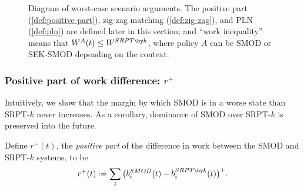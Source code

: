 \documentclass[acmsmall]{acmart}
\begin{document}
\begin{figure}
\caption{Diagram of worst-case scenario arguments. The positive part (\cref{def:positive-part}), zig-zag matching (\cref{def:zig-zag}), and PLN (\cref{def:pln}) are defined later in this section; and ``work inequality'' means that $W^A(t)\leq W^{SRPT\hy k}$, where policy $A$ can be SMOD or SEK-SMOD depending on the context.} \label{diagram:worst-case}
\end{figure}



\subsubsection{Positive part of work difference: $r^+$}
\label{sec:positive-part}

 Intuitively, we show that the margin by which SMOD is in a worse state than SRPT-$k$ never increases. As a corollary, dominance of SMOD over SRPT-$k$ is preserved into the future.

\begin{definition}\label{def:positive-part}
    Define $r^+(t)$, the \textit{positive part} of the difference in work between the SMOD and SRPT-$k$ systems,
    to be
    \begin{align*}
        r^+(t) := \sum_{i} \big(b_i^{SMOD}(t) - b_i^{SRPT\hy k}(t)\big)^+.
    \end{align*}
\end{definition}
\end{document}
